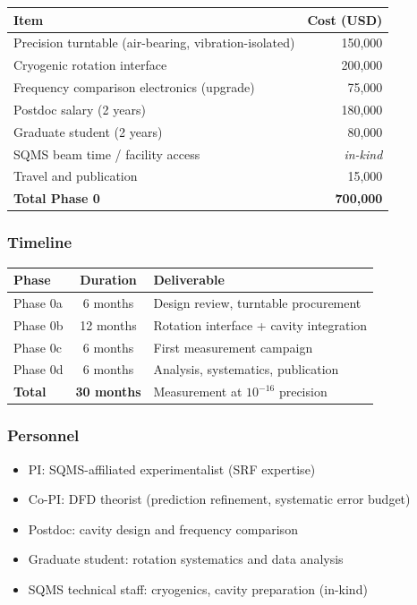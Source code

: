 \documentclass[11pt,a4paper]{article}
\begin{document}
\begin{center}
\begin{tabular}{lr}
\toprule
\textbf{Item} & \textbf{Cost (USD)} \\
\midrule
Precision turntable (air-bearing, vibration-isolated) & 150,000 \\
Cryogenic rotation interface & 200,000 \\
Frequency comparison electronics (upgrade) & 75,000 \\
Postdoc salary (2 years) & 180,000 \\
Graduate student (2 years) & 80,000 \\
SQMS beam time / facility access & \textit{in-kind} \\
Travel and publication & 15,000 \\
\midrule
\textbf{Total Phase 0} & \textbf{700,000} \\
\bottomrule
\end{tabular}
\end{center}

\subsubsection{Timeline}

\begin{center}
\begin{tabular}{lcl}
\toprule
\textbf{Phase} & \textbf{Duration} & \textbf{Deliverable} \\
\midrule
Phase 0a & 6 months & Design review, turntable procurement \\
Phase 0b & 12 months & Rotation interface + cavity integration \\
Phase 0c & 6 months & First measurement campaign \\
Phase 0d & 6 months & Analysis, systematics, publication \\
\midrule
\textbf{Total} & \textbf{30 months} & Measurement at $10^{-16}$ precision \\
\bottomrule
\end{tabular}
\end{center}

\subsubsection{Personnel}

\begin{itemize}
\item PI: SQMS-affiliated experimentalist (SRF expertise)
\item Co-PI: DFD theorist (prediction refinement, systematic error budget)
\item Postdoc: cavity design and frequency comparison
\item Graduate student: rotation systematics and data analysis
\item SQMS technical staff: cryogenics, cavity preparation (in-kind)
\end{itemize}
\end{document}
